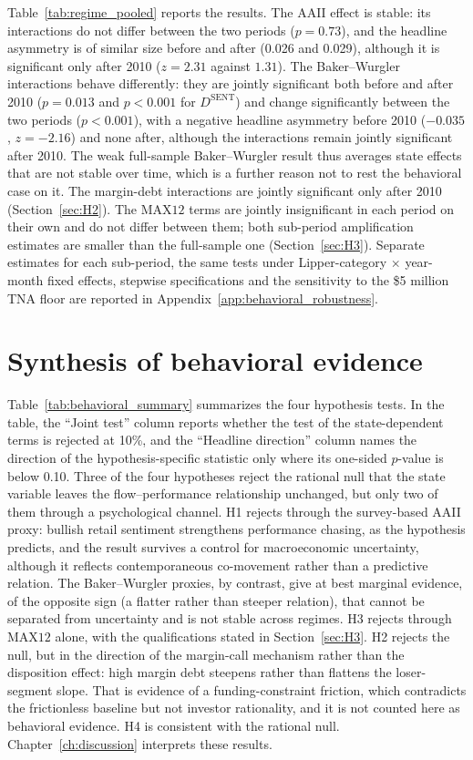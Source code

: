 \documentclass[12pt, oneside]{report}
\begin{document}
Table~\ref{tab:regime_pooled} reports the results. The AAII effect is
stable: its interactions do not differ between the two periods
($p = 0.73$), and the headline asymmetry is of similar size before and
after (0.026 and 0.029), although it is significant only after 2010
($z = 2.31$ against $1.31$). The Baker--Wurgler interactions behave
differently: they are jointly significant both before and after 2010
($p = 0.013$ and $p < 0.001$ for $D^{\text{SENT}}$) and change
significantly between the two periods ($p < 0.001$), with a negative
headline asymmetry before 2010 ($-0.035$, $z = -2.16$) and none after,
although the interactions remain jointly significant after 2010.
The weak full-sample Baker--Wurgler result thus averages state effects
that are not stable over time, which is a further reason not to rest the
behavioral case on it. The margin-debt interactions are jointly
significant only after 2010 (Section~\ref{sec:H2}). The $\text{MAX12}$
terms are jointly insignificant in each period on their own and do not
differ between them; both sub-period amplification estimates are smaller
than the full-sample one (Section~\ref{sec:H3}). Separate estimates for each sub-period, the same tests under
Lipper-category $\times$ year-month fixed effects, stepwise
specifications and the sensitivity to the \$5 million TNA floor are
reported in Appendix~\ref{app:behavioral_robustness}.

\section{Synthesis of behavioral evidence}
\label{sec:behavioral_summary}

\noindent Table~\ref{tab:behavioral_summary} summarizes the four
hypothesis tests. In the table, the ``Joint test'' column reports whether
the test of the state-dependent terms is rejected at 10\%, and the
``Headline direction'' column names the direction of the
hypothesis-specific statistic only where its one-sided $p$-value is below
0.10. Three of the four hypotheses reject the rational null that the
state variable leaves the flow--performance relationship unchanged, but
only two of them through a psychological channel. H1 rejects through the
survey-based AAII proxy: bullish retail sentiment strengthens performance
chasing, as the hypothesis predicts, and the result survives a control
for macroeconomic uncertainty, although it reflects contemporaneous
co-movement rather than a predictive relation. The Baker--Wurgler
proxies, by contrast, give at best marginal evidence, of the opposite
sign (a flatter rather than steeper relation), that cannot be separated
from uncertainty and is not stable across regimes. H3 rejects through
$\text{MAX12}$ alone, with the qualifications stated in
Section~\ref{sec:H3}. H2 rejects the null, but in the direction of the
\textcite{BrunnermeierPedersen2009} margin-call mechanism rather than the
disposition effect: high margin debt steepens rather than flattens the
loser-segment slope. That is evidence of a funding-constraint friction,
which contradicts the frictionless baseline but not investor rationality,
and it is not counted here as behavioral evidence. H4 is consistent with
the rational null. Chapter~\ref{ch:discussion} interprets these results.
\end{document}
